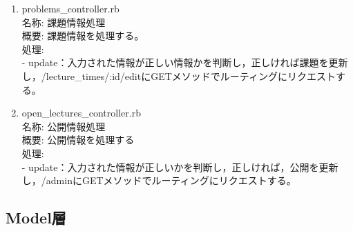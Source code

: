 \begin{enumerate}
\item problems\_controller.rb\\
名称:
課題情報処理\\
概要:
課題情報を処理する。\\
処理:\\
- update：入力された情報が正しい情報かを判断し，正しければ課題を更新し，/lecture\_times/:id/editにGETメソッドでルーティングにリクエストする。

\item open\_lectures\_controller.rb\\
名称:
公開情報処理\\
概要:
公開情報を処理する\\
処理:\\
- update：入力された情報が正しいかを判断し，正しければ，公開を更新し，/adminにGETメソッドでルーティングにリクエストする。
\end{enumerate}


\newpage

\subsection{Model層}

